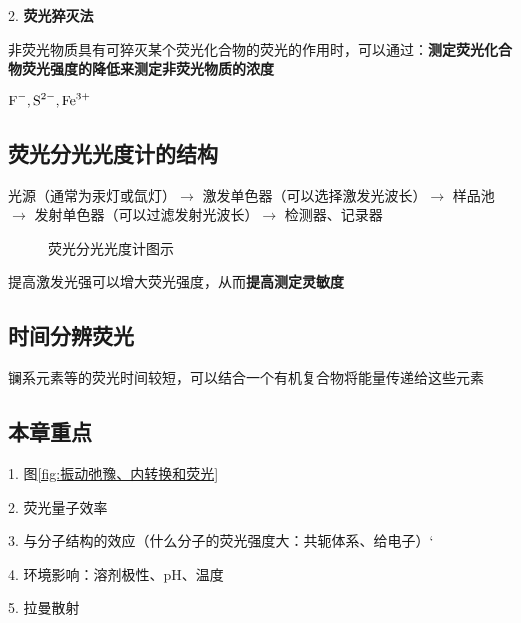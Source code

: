 2. \textbf{荧光猝灭法}
\begin{notation}
    非荧光物质具有可猝灭某个荧光化合物的荧光的作用时，可以通过：\textbf{测定荧光化合物荧光强度的降低来测定非荧光物质的浓度} 
\end{notation}
\begin{eg}
    $\ce{F^-}, \ce{S^{2-}}, \ce{Fe^{3+}}$
\end{eg}
\subsection{荧光分光光度计的结构}%
\label{sub:荧光分光光度计的结构}
光源（通常为汞灯或氙灯）$\to $ 激发单色器（可以选择激发光波长）$\to $ 样品池$\to $ 发射单色器（可以过滤发射光波长）$\to $ 检测器、记录器
\begin{figure}[ht!]
    \centering
    \caption{荧光分光光度计图示}
    \label{fig:荧光分光光度计图示}
\end{figure}
\begin{notation}
    提高激发光强可以增大荧光强度，从而\textbf{提高测定灵敏度}
\end{notation}
\subsection{时间分辨荧光}%
\label{sub:时间分辨荧光}
镧系元素等的荧光时间较短，可以结合一个有机复合物将能量传递给这些元素
\subsection{本章重点}%
\label{sub:本章重点}
1. 图\ref{fig:振动弛豫、内转换和荧光}

2. 荧光量子效率

3. 与分子结构的效应（什么分子的荧光强度大：共轭体系、给电子）‘

4. 环境影响：溶剂极性、pH、温度

5. 拉曼散射
